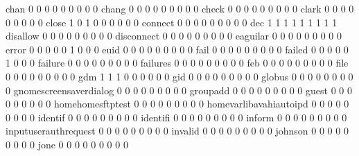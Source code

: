 \documentclass[compress,8pt]{beamer}
\begin{document}
\begin{frame}
\begin{Schunk}
  chan                                       0   0   0   0   0   0   0   0   0
  chang                                      0   0   0   0   0   0   0   0   0
  check                                      0   0   0   0   0   0   0   0   0
  clark                                      0   0   0   0   0   0   0   0   0
  close                                      1   0   1   0   0   0   0   0   0
  connect                                    0   0   0   0   0   0   0   0   0
  dec                                        1   1   1   1   1   1   1   1   1
  disallow                                   0   0   0   0   0   0   0   0   0
  disconnect                                 0   0   0   0   0   0   0   0   0
  eaguilar                                   0   0   0   0   0   0   0   0   0
  error                                      0   0   0   0   0   1   0   0   0
  euid                                       0   0   0   0   0   0   0   0   0
  fail                                       0   0   0   0   0   0   0   0   0
  failed                                     0   0   0   0   0   1   0   0   0
  failure                                    0   0   0   0   0   0   0   0   0
  failures                                   0   0   0   0   0   0   0   0   0
  feb                                        0   0   0   0   0   0   0   0   0
  file                                       0   0   0   0   0   0   0   0   0
  gdm                                        1   1   1   0   0   0   0   0   0
  gid                                        0   0   0   0   0   0   0   0   0
  globus                                     0   0   0   0   0   0   0   0   0
  gnomescreensaverdialog                     0   0   0   0   0   0   0   0   0
  groupadd                                   0   0   0   0   0   0   0   0   0
  guest                                      0   0   0   0   0   0   0   0   0
  homehomesftptest                           0   0   0   0   0   0   0   0   0
  homevarlibavahiautoipd                     0   0   0   0   0   0   0   0   0
  identif                                    0   0   0   0   0   0   0   0   0
  identifi                                   0   0   0   0   0   0   0   0   0
  inform                                     0   0   0   0   0   0   0   0   0
  inputuserauthrequest                       0   0   0   0   0   0   0   0   0
  invalid                                    0   0   0   0   0   0   0   0   0
  johnson                                    0   0   0   0   0   0   0   0   0
  jone                                       0   0   0   0   0   0   0   0   0

\end{Schunk}
\end{frame}
\end{document}
